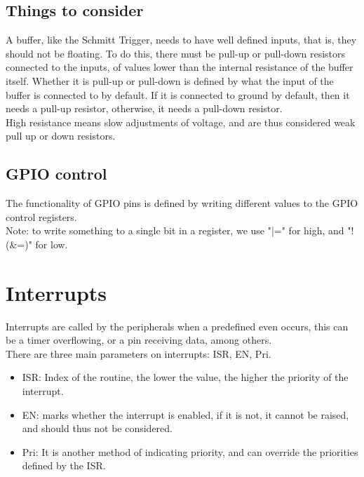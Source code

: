 \documentclass[nobib]{tufte-handout}
\begin{document}
\subsection{Things to consider}

A buffer, like the Schmitt Trigger, needs to have well defined inputs, that is,
they should not be floating. To do this, there must be pull-up or pull-down
resistors connected to the inputs, of values lower than the internal resistance
of the buffer itself. Whether it is pull-up or pull-down is defined by what the
input of the buffer is connected to by default. If it is connected to ground by
default, then it needs a pull-up resistor, otherwise, it needs a pull-down
resistor.\\ High resistance means slow adjustments of voltage, and are thus
considered weak pull up or down resistors.

\subsection{GPIO control}
The functionality of GPIO pins is defined by writing different values to the
GPIO control registers.\\ Note: to write something to a single bit in a
register, we use "|=" for high, and "!(\&=)" for low.

\section{Interrupts}
Interrupts are called by the peripherals when a predefined even occurs, this
can be a timer overflowing, or a pin receiving data, among others.\\ There are
three main parameters on interrupts: ISR, EN, Pri.

\begin{itemize}
    \item ISR: Index of the routine, the lower the value, the higher the priority of the
          interrupt.
    \item EN: marks whether the interrupt is enabled, if it is not, it cannot be raised,
          and should thus not be considered.
    \item Pri: It is another method of indicating priority, and can override the
          priorities defined by the ISR.
\end{itemize}
\end{document}
